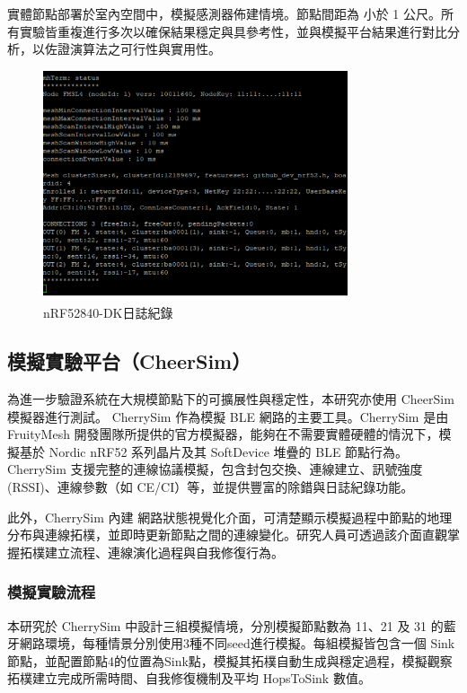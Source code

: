 \begin{ZhChapter}
實體節點部署於室內空間中，模擬感測器佈建情境。節點間距為 小於 1 公尺。所有實驗皆重複進行多次以確保結果穩定與具參考性，並與模擬平台結果進行對比分析，以佐證演算法之可行性與實用性。

\begin{figure}[H]
    \centering
    \includegraphics[width = 0.8\textwidth]{image/UART日誌紀錄.png}
    \caption{nRF52840-DK日誌紀錄}
    \label{fig: nRF52840-DK日誌紀錄}
\end{figure}

\subsection{模擬實驗平台（CheerSim）}
為進一步驗證系統在大規模節點下的可擴展性與穩定性，本研究亦使用 CheerSim 模擬器進行測試。 CherrySim 作為模擬 BLE 網路的主要工具。CherrySim 是由 FruityMesh 開發團隊所提供的官方模擬器，能夠在不需要實體硬體的情況下，模擬基於 Nordic nRF52 系列晶片及其 SoftDevice 堆疊的 BLE 節點行為。CherrySim 支援完整的連線協議模擬，包含封包交換、連線建立、訊號強度 (RSSI)、連線參數（如 CE/CI）等，並提供豐富的除錯與日誌紀錄功能。

此外，CherrySim 內建 網路狀態視覺化介面，可清楚顯示模擬過程中節點的地理分布與連線拓樸，並即時更新節點之間的連線變化。研究人員可透過該介面直觀掌握拓樸建立流程、連線演化過程與自我修復行為。

\subsubsection{模擬實驗流程}
本研究於 CherrySim 中設計三組模擬情境，分別模擬節點數為 11、21 及 31 的藍牙網路環境，每種情景分別使用3種不同seed進行模擬。每組模擬皆包含一個 Sink 節點，並配置節點4的位置為Sink點，模擬其拓樸自動生成與穩定過程，模擬觀察拓樸建立完成所需時間、自我修復機制及平均 HopsToSink 數值。


\end{ZhChapter}
